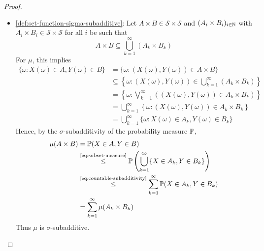 \begin{proof}
\begin{itemize}
\item
\ref{def:set-function-sigma-subadditive}:
Let \(A \times B \in \mathcal{S} \times \mathcal{S}\) and \((A_i \times B_i)_{i \in \mathbb{N}}\) with \(A_i \times B_i \in \mathcal{S} \times \mathcal{S}\) for all \(i\) be such that
\[
A \times B \subseteq \bigcup_{k=1}^{\infty} (A_k \times B_k)
\]
For \(\mu\), this implies %
\begingroup
\allowdisplaybreaks
\begin{align*}
\{\omega  : X(\omega) \in A, Y(\omega) \in B\}
&=
\{\omega  : (X(\omega),Y(\omega)) \in A \times B\} \\
&\subseteq %
\left\{\omega  : (X(\omega),Y(\omega)) \in \bigcup_{k=1}^{\infty}(A_k \times B_k)\right\} \\
&=
\left\{\omega  : \bigvee_{k=1}^{\infty}\left((X(\omega),Y(\omega)) \in A_k \times B_k\right)\right\} \\
&=
\bigcup_{k=1}^{\infty}
\left\{\omega  : (X(\omega),Y(\omega)) \in A_k \times B_k\right\} \\
&=
\bigcup_{k=1}^{\infty}
\{\omega  : X(\omega) \in A_k, Y(\omega) \in B_k\}
\end{align*}
\endgroup
Hence, by the \(\sigma\)-subadditivity of the probability measure \(\mathbb{P}\),
\[
\begin{aligned}
\mu(A \times B)
&=
\mathbb{P}(X \in A, Y \in B) \\
&\overset{\text{\eqref{eq:subset-measure}}}{\leq}
\mathbb{P}\left(
\bigcup_{k=1}^{\infty}\{X \in A_k, Y \in B_k\}
\right) \\
&\overset{\text{\eqref{eq:countable-subadditivity}}}{\leq}
\sum_{k=1}^{\infty}\mathbb{P}(X \in A_k, Y \in B_k) \\
&=
\sum_{k=1}^{\infty}\mu(A_k \times B_k)
\end{aligned}
\]
Thus \(\mu\) is \(\sigma\)-subadditive.


\end{itemize}
\end{proof}
